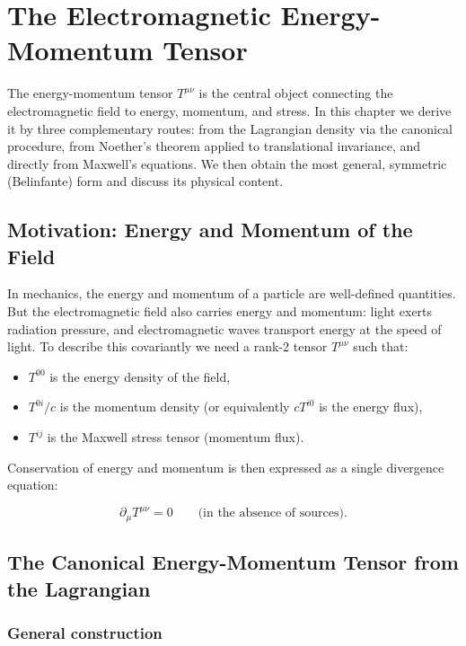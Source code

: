 \chapter{The Electromagnetic Energy-Momentum Tensor}

The energy-momentum tensor $T^{\mu\nu}$ is the central object connecting the electromagnetic field to energy, momentum, and stress. In this chapter we derive it by three complementary routes: from the Lagrangian density via the canonical procedure, from Noether's theorem applied to translational invariance, and directly from Maxwell's equations. We then obtain the most general, symmetric (Belinfante) form and discuss its physical content.

\section{Motivation: Energy and Momentum of the Field}

In mechanics, the energy and momentum of a particle are well-defined quantities. But the electromagnetic field also carries energy and momentum: light exerts radiation pressure, and electromagnetic waves transport energy at the speed of light. To describe this covariantly we need a rank-2 tensor $T^{\mu\nu}$ such that:

\begin{itemize}
\item $T^{00}$ is the energy density of the field,
\item $T^{0i}/c$ is the momentum density (or equivalently $cT^{i0}$ is the energy flux),
\item $T^{ij}$ is the Maxwell stress tensor (momentum flux).
\end{itemize}

Conservation of energy and momentum is then expressed as a single divergence equation:

\begin{equation}
\partial_\mu T^{\mu\nu} = 0 \qquad \text{(in the absence of sources)}.
\end{equation}

\section{The Canonical Energy-Momentum Tensor from the Lagrangian}

\subsection{General construction}

